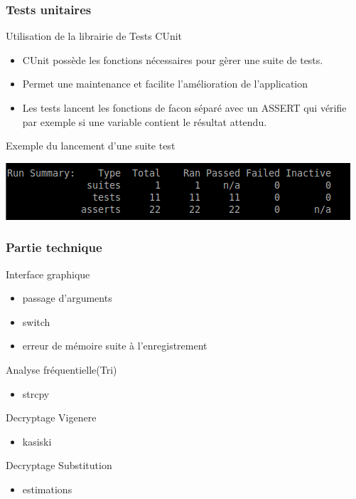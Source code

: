 \documentclass[10pt,xcolor=table]{beamer}
\begin{document}
\begin{frame}[<+->]
  \frametitle{Tests unitaires}
  \begin{block}{Utilisation de la librairie de Tests CUnit}
    \begin{itemize}
    \pause
  \item CUnit possède les fonctions nécessaires pour gèrer une suite de tests.
  \item Permet une maintenance et facilite l'amélioration de l'application
  \item Les tests lancent les fonctions de facon séparé avec un ASSERT qui vérifie par exemple si une variable contient le résultat attendu.\\
    \end{itemize}
  \end{block}
    \begin{block}{Exemple du lancement d'une suite test}
    \begin{center}
       \includegraphics[scale = 0.6]{Capture.png}
    \end{center}
  \end{block}

\end{frame}
\begin{frame}[<+->]
  \frametitle{Partie technique}
	\begin{block}{Interface graphique}
	\begin{itemize}
		\item passage d'arguments\\ 
		\item switch\\ 
		\item erreur de mémoire suite à l'enregistrement
	\end{itemize}
	\end{block}
	\begin{block}{Analyse fréquentielle(Tri)}
	\begin{itemize}
		\item strcpy 
	\end{itemize}
	\end{block}
	\begin{block}{Decryptage Vigenere}
	\begin{itemize}
		\item kasiski\\ 
	\end{itemize}
	\end{block}
	\begin{block}{Decryptage Substitution}
	\begin{itemize}
		\item estimations\\ 
	\end{itemize}
	\end{block}
\end{frame}
\end{document}
